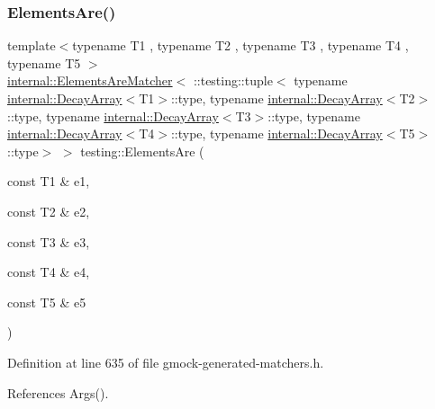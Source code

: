 \subsubsection{\texorpdfstring{Elements\+Are()}{ElementsAre()}\hspace{0.1cm}{\footnotesize\ttfamily [6/11]}}
{\footnotesize\ttfamily template$<$typename T1 , typename T2 , typename T3 , typename T4 , typename T5 $>$ \\
\hyperlink{classtesting_1_1internal_1_1ElementsAreMatcher}{internal\+::\+Elements\+Are\+Matcher}$<$ \+::testing\+::tuple$<$ typename \hyperlink{structtesting_1_1internal_1_1DecayArray}{internal\+::\+Decay\+Array}$<$T1$>$\+::type, typename \hyperlink{structtesting_1_1internal_1_1DecayArray}{internal\+::\+Decay\+Array}$<$T2$>$\+::type, typename \hyperlink{structtesting_1_1internal_1_1DecayArray}{internal\+::\+Decay\+Array}$<$T3$>$\+::type, typename \hyperlink{structtesting_1_1internal_1_1DecayArray}{internal\+::\+Decay\+Array}$<$T4$>$\+::type, typename \hyperlink{structtesting_1_1internal_1_1DecayArray}{internal\+::\+Decay\+Array}$<$T5$>$\+::type$>$ $>$ testing\+::\+Elements\+Are (\begin{DoxyParamCaption}\item[{const T1 \&}]{e1,  }\item[{const T2 \&}]{e2,  }\item[{const T3 \&}]{e3,  }\item[{const T4 \&}]{e4,  }\item[{const T5 \&}]{e5 }\end{DoxyParamCaption})\hspace{0.3cm}{\ttfamily [inline]}}



Definition at line 635 of file gmock-\/generated-\/matchers.\+h.



References Args().


